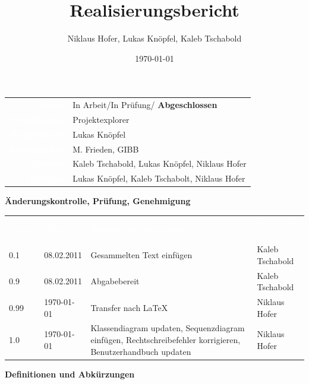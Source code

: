 \documentclass[10pt,paper=a4,final]{scrartcl}
\title{Realisierungsbericht}
\author{Niklaus Hofer, Lukas Kn\"opfel, Kaleb Tschabold}
\date{\today}
\begin{document}
\maketitle
\newpage
\begin{tabularx}{\textwidth}{ r X }	%
  \textcolor{white}{{\bf Status}}\cellcolor{blue!80!} & In Arbeit/In Prüfung/ {\bf Abgeschlossen}\cellcolor{blue!20!} \\
\textcolor{white}{{\bf Projektname}}\cellcolor{blue!80!} & Projektexplorer\cellcolor{blue!20!} \\
\textcolor{white}{{\bf Projektleiter}}\cellcolor{blue!80!} & Lukas Kn\"opfel\cellcolor{blue!20!} \\
\textcolor{white}{{\bf Auftraggeber}}\cellcolor{blue!80!} & M. Frieden, GIBB\cellcolor{blue!20!} \\
\textcolor{white}{{\bf Autoren}}\cellcolor{blue!80!} & Kaleb Tschabold, Lukas Kn\"opfel, Niklaus Hofer\cellcolor{blue!20!} \\
\textcolor{white}{{\bf Verteiler}}\cellcolor{blue!80!} & Lukas Knöpfel, Kaleb Tschabolt, Niklaus Hofer\cellcolor{blue!20!}
\end{tabularx}
\newline
\newline
\newline
{\bf Änderungskontrolle, Prüfung, Genehmigung}
\newline

\begin{tabularx}{\textwidth}{l l X X}
\textcolor{white}{Version}\cellcolor{blue!80!} & \textcolor{white}{Datum}\cellcolor{blue!80!} & \textcolor{white}{Beschreibung, Bemerkung}\cellcolor{blue!80!} & \textcolor{white}{Name oder Rolle}\cellcolor{blue!80!} \\
\cellcolor{blue!20!} 0.1& \cellcolor{blue!20!} 08.02.2011 & Gesammelten Text einfügen \cellcolor{blue!20!} & Kaleb Tschabold \cellcolor{blue!20!} \\
\cellcolor{blue!20!} 0.9& \cellcolor{blue!20!} 08.02.2011 & Abgabebereit \cellcolor{blue!20!} & Kaleb Tschabold \cellcolor{blue!20!} \\
\cellcolor{blue!20!} 0.99& \cellcolor{blue!20!} \today{} & Transfer nach \LaTeX \cellcolor{blue!20!} & Niklaus Hofer \cellcolor{blue!20!} \\
\cellcolor{blue!20!} 1.0& \cellcolor{blue!20!} \today{} & Klassendiagram updaten, Sequenzdiagram einf\"ugen, Rechtschreibefehler korrigieren, Benutzerhandbuch updaten\cellcolor{blue!20!} & Niklaus Hofer \cellcolor{blue!20!} \\
\end{tabularx}
\newline
\newline
\newline
{\bf Definitionen und Abkürzungen}
\newline
\end{document}
